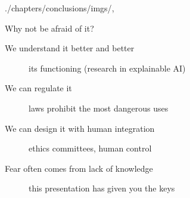 \begin{graphicspathcontext}{{./chapters/conclusions/imgs/},\old}
\begin{frame}{Why not be afraid of it?}
	\begin{description}
	\item[We understand it better and better] its functioning (research in explainable AI)
	\vspace{.25cm}
	\item[We can regulate it] laws prohibit the most dangerous uses
	\vspace{.25cm}
	\item[We can design it with human integration] ethics committees, human control
	\vspace{.25cm}
	\item[Fear often comes from lack of knowledge] this presentation has given you the keys
	\end{description}
	\vspace{1cm}
	\larger
\end{frame}

\end{graphicspathcontext}

\endinput
